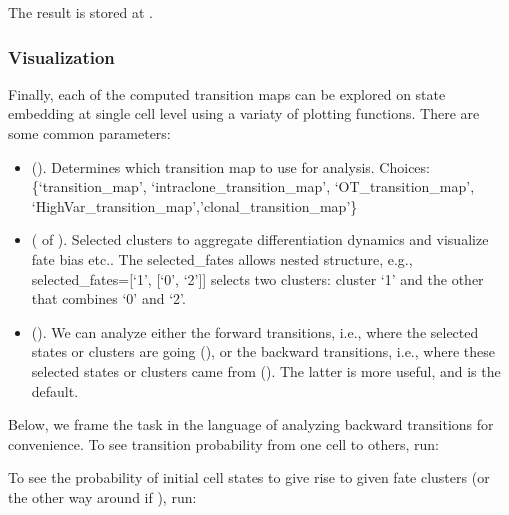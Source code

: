 \documentclass[letterpaper,10pt,english]{sphinxmanual}
\begin{document}
The result is stored at .


\subsubsection{Visualization}
\label{\detokenize{getting_started:visualization}}
Finally, each of the computed transition maps can be explored on state embedding at single cell level using a variaty of plotting functions. There are some common parameters:
\begin{itemize}
\item {} 
 (). Determines which transition map to use for analysis. Choices: \{‘transition\_map’, ‘intraclone\_transition\_map’, ‘OT\_transition\_map’, ‘HighVar\_transition\_map’,’clonal\_transition\_map’\}

\item {} 
 ( of ). Selected clusters to aggregate differentiation dynamics and visualize fate bias etc.. The selected\_fates allows nested structure, e.g., selected\_fates={[}‘1’, {[}‘0’, ‘2’{]}{]} selects two clusters:  cluster ‘1’ and the other that combines ‘0’ and ‘2’.

\item {} 
 ().  We can analyze either the forward transitions, i.e., where the selected states or clusters are going (), or the backward transitions, i.e., where these selected states or clusters came from (). The latter is more useful, and is the default.

\end{itemize}

Below, we frame the task in the language of analyzing backward transitions for convenience. To see transition probability from one cell to others, run:

\begin{sphinxVerbatim}[commandchars=\\\{\}]
\end{sphinxVerbatim}

To see the probability of initial cell states to give rise to given fate clusters (or the other way around if ), run:
\end{document}
